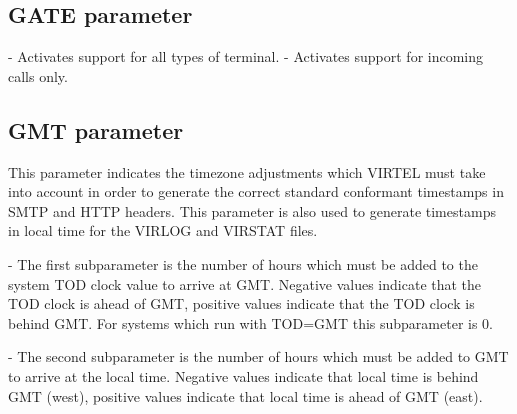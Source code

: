 \documentclass[letterpaper,10pt,english]{sphinxmanual}
\begin{document}

\subsection{GATE parameter}
\label{\detokenize{Installation_Guide:index-66}}\label{\detokenize{Installation_Guide:gate-parameter}}
\begin{sphinxVerbatim}[commandchars=\\\{\}]
 
\end{sphinxVerbatim}

 - Activates support for all types of terminal.
 - Activates support for incoming calls only.


\subsection{GMT parameter}
\label{\detokenize{Installation_Guide:index-67}}\label{\detokenize{Installation_Guide:gmt-parameter}}
\begin{sphinxVerbatim}[commandchars=\\\{\}]
 
\end{sphinxVerbatim}

This parameter indicates the timezone adjustments which VIRTEL must take into account in order to generate the correct standard conformant timestamps in SMTP and HTTP headers. This parameter is also used to generate
timestamps in local time for the VIRLOG and VIRSTAT files.

 - The first subparameter is the number of hours which must be added to the system TOD clock value to arrive at GMT. Negative values indicate that the TOD clock is ahead of GMT, positive values indicate that the TOD clock is behind GMT. For systems which run with TOD=GMT this subparameter is 0.

 - The second subparameter is the number of hours which must be added to GMT to arrive at the local time. Negative values indicate that local time is behind GMT (west), positive values indicate that local time is ahead of GMT (east).
\end{document}
